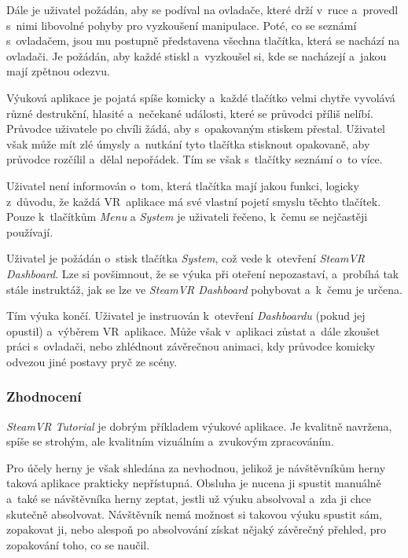 Dále je uživatel požádán, aby se podíval na ovladače, které drží v~ruce
a~provedl s~nimi libovolné pohyby pro vyzkoušení manipulace.
Poté, co se seznámí s~ovladačem, jsou mu postupně představena
všechna tlačítka, která se nachází na ovladači. Je požádán, aby každé
stiskl a~vyzkoušel si, kde se nacházejí a~jakou mají zpětnou odezvu.

Výuková aplikace je pojatá spíše komicky a~každé tlačítko velmi chytře
vyvolává různé destrukční, hlasité a~nečekané události, které se
průvodci příliš nelíbí. Průvodce uživatele po chvíli žádá, aby s~opakovaným
stiskem přestal. Uživatel však může mít zlé úmysly a~nutkání tyto tlačítka
stisknout opakovaně, aby průvodce rozčílil a~dělal nepořádek. Tím se
však s~tlačítky seznámí o~to více.

Uživatel není informován o~tom, která tlačítka mají jakou funkci, logicky
z~důvodu, že každá VR~aplikace má své vlastní pojetí smyslu těchto
tlačítek. Pouze k~tlačítkům \emph{Menu} a \emph{System} je uživateli
řečeno, k~čemu se nejčastěji používají.

Uživatel je požádán o~stisk tlačítka \emph{System}, což vede k~otevření
\emph{SteamVR Dashboard}. Lze si povšimnout, že se výuka při oteření
nepozastaví, a~probíhá tak stále instruktáž, jak se lze ve \emph{SteamVR
Dashboard} pohybovat a~k~čemu je určena.

Tím výuka končí. Uživatel je instruován k~otevření
\emph{Dashboardu} (pokud jej opustil) a~výběrem VR~aplikace. Může však
v~aplikaci zůstat a~dále zkoušet práci s~ovladači, nebo zhlédnout
závěrečnou animaci, kdy průvodce komicky odvezou jiné postavy pryč ze
scény.

\subsubsection{Zhodnocení}\label{zhodnocenuxed}

\emph{SteamVR Tutorial} je dobrým příkladem výukové aplikace. Je kvalitně
navržena, spíše se strohým, ale kvalitním vizuálním a~zvukovým
zpracováním.

Pro účely herny je však shledána za nevhodnou, jelikož je návštěvníkům herny
taková aplikace prakticky nepřístupná. Obsluha je nucena ji spustit
manuálně a~také se návštěvníka herny zeptat, jestli už výuku absolvoval
a~zda ji chce skutečně absolvovat. Návštěvník nemá možnost si takovou
výuku spustit sám, zopakovat ji, nebo alespoň po absolvování získat
nějaký závěrečný přehled, pro zopakování toho, co se naučil.

